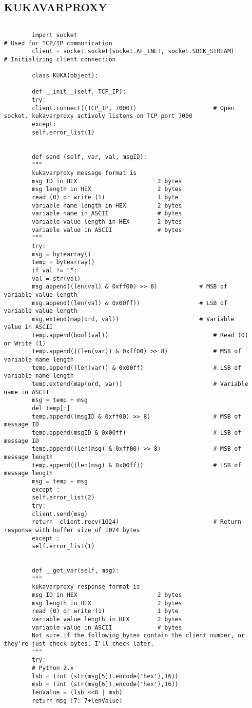 \documentclass{book}
\begin{document}
		\subsection{KUKAVARPROXY}
		\begin{verbatim}
		
		import socket                                                   # Used for TCP/IP communication
		client = socket.socket(socket.AF_INET, socket.SOCK_STREAM)		# Initializing client connection
		
		class KUKA(object):
		
		def __init__(self, TCP_IP):
		try: 
		client.connect((TCP_IP, 7000))                      # Open socket. kukavarproxy actively listens on TCP port 7000
		except: 
		self.error_list(1)
		
		
		def send (self, var, val, msgID):
		"""
		kukavarproxy message format is 
		msg ID in HEX                       2 bytes
		msg length in HEX                   2 bytes
		read (0) or write (1)               1 byte
		variable name length in HEX         2 bytes
		variable name in ASCII              # bytes
		variable value length in HEX        2 bytes
		variable value in ASCII             # bytes
		"""
		try:
		msg = bytearray()
		temp = bytearray()
		if val != "":
		val = str(val)
		msg.append((len(val) & 0xff00) >> 8)            # MSB of variable value length
		msg.append((len(val) & 0x00ff))                 # LSB of variable value length
		msg.extend(map(ord, val))                       # Variable value in ASCII
		temp.append(bool(val))                              # Read (0) or Write (1)
		temp.append(((len(var)) & 0xff00) >> 8)             # MSB of variable name length
		temp.append((len(var)) & 0x00ff)                    # LSB of variable name length
		temp.extend(map(ord, var))                          # Variable name in ASCII 
		msg = temp + msg
		del temp[:]
		temp.append((msgID & 0xff00) >> 8)                  # MSB of message ID
		temp.append(msgID & 0x00ff)                         # LSB of message ID
		temp.append((len(msg) & 0xff00) >> 8)               # MSB of message length
		temp.append((len(msg) & 0x00ff))                    # LSB of message length
		msg = temp + msg
		except :
		self.error_list(2)
		try:
		client.send(msg)
		return  client.recv(1024)                           # Return response with buffer size of 1024 bytes
		except :
		self.error_list(1)
		
		
		def __get_var(self, msg):
		"""
		kukavarproxy response format is 
		msg ID in HEX                       2 bytes
		msg length in HEX                   2 bytes
		read (0) or write (1)               1 byte
		variable value length in HEX        2 bytes
		variable value in ASCII             # bytes
		Not sure if the following bytes contain the client number, or they're just check bytes. I'll check later.
		"""
		try:
		# Python 2.x
		lsb = (int (str(msg[5]).encode('hex'),16))
		msb = (int (str(msg[6]).encode('hex'),16))
		lenValue = (lsb <<8 | msb)
		return msg [7: 7+lenValue]
		

\end{verbatim}
\end{document}
